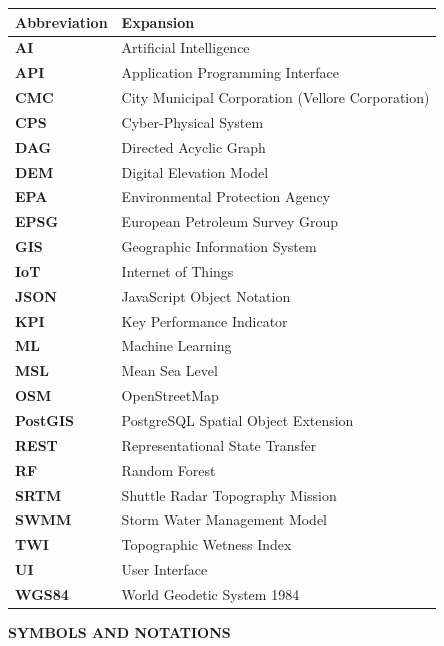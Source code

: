 \documentclass[12pt,a4paper]{report}
\begin{document}
\begin{table}[h!]
\centering
\begin{tabular}{ll}
\textbf{Abbreviation} & \textbf{Expansion} \\
\hline
\textbf{AI} & Artificial Intelligence \\
\textbf{API} & Application Programming Interface \\
\textbf{CMC} & City Municipal Corporation (Vellore Corporation) \\
\textbf{CPS} & Cyber-Physical System \\
\textbf{DAG} & Directed Acyclic Graph \\
\textbf{DEM} & Digital Elevation Model \\
\textbf{EPA} & Environmental Protection Agency \\
\textbf{EPSG} & European Petroleum Survey Group \\
\textbf{GIS} & Geographic Information System \\
\textbf{IoT} & Internet of Things \\
\textbf{JSON} & JavaScript Object Notation \\
\textbf{KPI} & Key Performance Indicator \\
\textbf{ML} & Machine Learning \\
\textbf{MSL} & Mean Sea Level \\
\textbf{OSM} & OpenStreetMap \\
\textbf{PostGIS} & PostgreSQL Spatial Object Extension \\
\textbf{REST} & Representational State Transfer \\
\textbf{RF} & Random Forest \\
\textbf{SRTM} & Shuttle Radar Topography Mission \\
\textbf{SWMM} & Storm Water Management Model \\
\textbf{TWI} & Topographic Wetness Index \\
\textbf{UI} & User Interface \\
\textbf{WGS84} & World Geodetic System 1984 \\
\hline
\end{tabular}
\end{table}

\clearpage


\thispagestyle{plain}
\begin{center}
    {\fontsize{14pt}{18pt}\selectfont \textbf{SYMBOLS AND NOTATIONS}\par}
\end{center}
\vspace{0.8cm}
\end{document}
